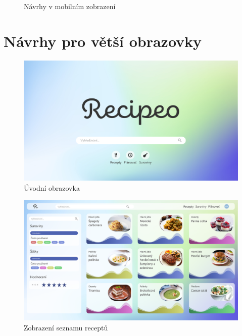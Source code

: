 \begin{figure}[h]
    \caption{Návrhy v mobilním zobrazení}
\end{figure}
\clearpage

\section{Návrhy pro větší obrazovky}

\begin{figure}[H]
    \includegraphics[width=\textwidth]{pdf/adobexd/uvod}
    \caption{Úvodní obrazovka} \label{picture:recipeo:navrh:uvod}
\end{figure}

\begin{figure}[H]
    \includegraphics[width=\textwidth]{pdf/adobexd/recepty}
    \caption{Zobrazení seznamu receptů} \label{picture:recipeo:navrh:recepty}
\end{figure}

